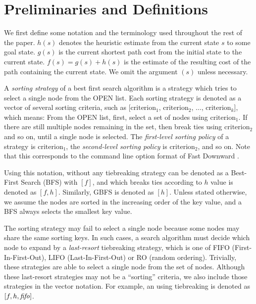 \section{Preliminaries and Definitions}

We first define some notation and the terminology used throughout the
rest of the paper.
$h(s)$ denotes the heuristic estimate from the current state $s$ to some
goal state.
$g(s)$ is the current shortest path cost from the initial state to the
current state.
$f(s)=g(s)+h(s)$ is the estimate of the resulting cost of the path
containing the current state.
We omit the argument $(s)$ unless necessary.

A \emph{sorting strategy} of a best first search algorithm is a strategy
which tries to select a single node from the OPEN list.
Each sorting strategy is denoted as a vector of several sorting
criteria, such as
[$\text{criterion}_1$, $\text{criterion}_2$, $\ldots$,
$\text{criterion}_k$], which means: From the OPEN list, first, select a
set of nodes using $\text{criterion}_1$.  If there are still multiple
nodes remaining in the set, then break ties using $\text{criterion}_2$
and so on, until a single node is selected.  The \emph{first-level
sorting policy} of a strategy is $\text{criterion}_1$, the
\emph{second-level sorting policy} is $\text{criterion}_2$, and so on.
Note that this corresponds to the command line option format of Fast
Downward \cite{Helmert2006}.

Using this notation, \astar without any tiebreaking strategy can be
denoted as a Best-First Search (BFS) with $[f]$, and \astar which breaks ties according to $h$
value is denoted as $[f,h]$. Similarly, GBFS is denoted as 
$[h]$.  Unless stated otherwise, we assume the nodes are sorted in the
increasing order of the key value, and a BFS always selects the smallest
key value.

The sorting strategy may fail to select a single node because some nodes
may share the same sorting keys. In such cases, a search algorithm must
decide which node to expand by a \emph{last-resort} tiebreaking
strategy, which is one of FIFO (First-In-First-Out), LIFO
(Last-In-First-Out) or RO (random ordering).  Trivially, these
strategies are able to select a single node from the set of
nodes. Although these last-resort strategies may not be a ``sorting''
criteria, we also include those strategies in the vector notation. For
example, an \astar using \fifo tiebreaking is denoted as $[f,h,{\mbox{\textit{fifo}}}]$.


